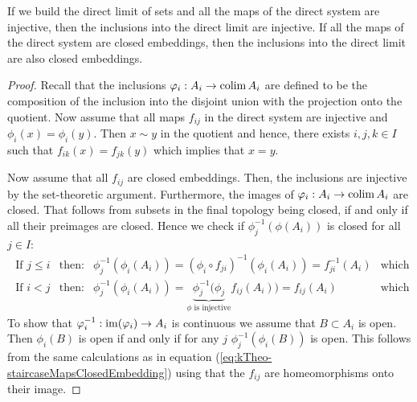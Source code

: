 \begin{remark}\label{rem:kTheo-staircaseMapsClosedEmbedding}
If we build the direct limit of sets and all the maps of the direct system are injective, then the inclusions into the direct limit are injective. If all the maps of the direct system are closed embeddings, then the inclusions into the direct limit are also closed embeddings.
\end{remark}
\begin{proof}
	Recall that the inclusions $\varphi_i:A_i\to \operatorname{\mathrm{colim}} A_i$ are defined to be the composition of the inclusion into the disjoint union with the projection onto the quotient. Now assume that all maps $f_{ij}$ in the direct system are injective and $\phi_i(x)=\phi_i(y)$. Then $x\sim y$ in the quotient and hence, there exists $i,j,k\in I$ such that $f_{ik}(x)=f_{jk}(y)$ which implies that $x=y$.

	Now assume that all $f_{ij}$ are closed embeddings. Then, the inclusions are injective by the set-theoretic argument. Furthermore, the images of $\varphi_i:A_i\to \operatorname{\mathrm{colim}} A_i$ are closed. That follows from subsets in the final topology being closed, if and only if all their preimages are closed. Hence we check if $\phi_j^{-1}(\phi(A_i))$ is closed for all $j\in I$:
	\begin{equation} \label{eq:kTheo-staircaseMapsClosedEmbedding}
		\begin{array}{llll}
			\text{ If }j\leq i& \text{then:} & \phi_j^{-1}(\phi_i(A_i))=(\phi_i\circ f_{ji})^{-1}(\phi_i(A_i))=f_{ji}^{-1}(A_i) &\text{which is closed.}\\
			\text{ If }i<j	 & \text{then:}	&\phi_j^{-1}(\phi_i(A_i)) =\underbrace{\phi_j^{-1}(\phi_j}_{\phi \text{ is injective}} f_{ij}(A_i))=f_{ij}(A_i) &\text{which is closed.}
		\end{array}
	\end{equation} To show that $\varphi_i^{-1}: \mathrm{im}(\varphi_i)\to A_i$ is continuous we assume that $B\subset A_i$ is open. Then $\phi_i(B)$ is open if and only if for any $j$ $\phi_j^{-1}(\phi_i(B))$ is open. This follows from the same calculations as in equation (\ref{eq:kTheo-staircaseMapsClosedEmbedding}) using that the $f_{ij}$ are homeomorphisms onto their image. 
\end{proof}

